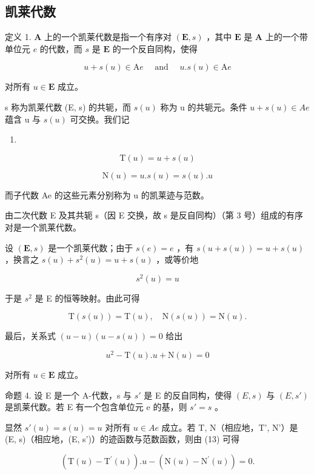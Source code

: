 \subsection{凯莱代数}

定义 1. \(\mathbf{A}\) 上的一个凯莱代数是指一个有序对 \((\mathbf{E}, s)\) ，其中 \(\mathbf{E}\) 是 \(\mathbf{A}\) 上的一个带单位元 \(e\) 的代数，而 \(s\) 是 \(\mathbf{E}\) 的一个反自同构，使得

\[
u + s (u) \in \mathrm{A} e \quad \text { and } \quad u. s (u) \in \mathrm{A} e
\]

对所有 \(u \in \mathbf{E}\) 成立。

s 称为凯莱代数 (E, s) 的共轭，而 \(s(u)\) 称为 u 的共轭元。条件 \(u + s(u) \in Ae\) 蕴含 u 与 \(s(u)\) 可交换。我们记

\begin{enumerate}
\def\labelenumi{(\arabic{enumi})}
\setcounter{enumi}{8}
\tightlist
\item
\end{enumerate}

\[
\mathrm{T} (u) = u + s (u)\tag{10}
\]

\[
\mathrm{N} (u) = u. s (u) = s (u). u
\]

而子代数 Ae 的这些元素分别称为 u 的凯莱迹与范数。

由二次代数 E 及其共轭 s（因 E 交换，故 s 是反自同构）（第 3 号）组成的有序对是一个凯莱代数。

设 \((\mathbf{E}, s)\) 是一个凯莱代数；由于 \(s(e) = e\) ，有 \(s(u + s(u)) = u + s(u)\) ，换言之 \(s(u) + s^2(u) = u + s(u)\) ，或等价地

\[
s ^ {2} (u) = u\tag{11}
\]

于是 \(s^{2}\) 是 E 的恒等映射。由此可得

\[
\mathrm{T} (s (u)) = \mathrm{T} (u), \quad \mathrm{N} (s (u)) = \mathrm{N} (u).\tag{12}
\]

最后，关系式 \((u - u)(u - s(u)) = 0\) 给出

\[
u ^ {2} - \mathrm{T} (u). u + \mathrm{N} (u) = 0\tag{13}
\]

对所有 \(u \in \mathbf{E}\) 成立。

命题 4. 设 E 是一个 A-代数，s 与 \(s'\) 是 E 的反自同构，使得 \((E, s)\) 与 \((E, s')\) 是凯莱代数。若 E 有一个包含单位元 e 的基，则 \(s' = s\) 。

显然 \(s'(u) = s(u) = u\) 对所有 \(u \in Ae\) 成立。若 T, N（相应地，T', N'）是 (E, s)（相应地，(E, s')）的迹函数与范数函数，则由 (13) 可得

\[
(\mathrm{T} (u) - \mathrm{T} ^ {\prime} (u)). u - (\mathrm{N} (u) - \mathrm{N} ^ {\prime} (u)) = 0.
\]

